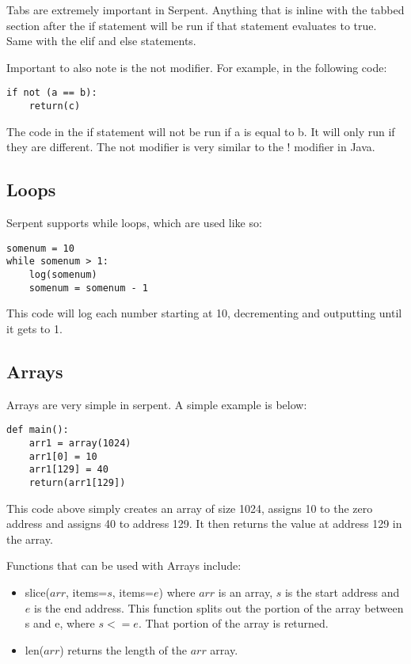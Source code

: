 \documentclass[12pt]{article}
\begin{document}
	Tabs are extremely important in Serpent. Anything that is inline with the tabbed section after the if statement will be run if that statement evaluates to true. Same with the elif and else statements. \cite{Serpent}
	
	Important to also note is the not modifier. For example, in the following code:
	
\begin{lstlisting}
if not (a == b):
	return(c)
\end{lstlisting}

The code in the if statement will not be run if a is equal to b. It will only run if they are different. The not modifier is very similar to the ! modifier in Java. \cite{Serpent}
	
\subsection{Loops}
Serpent supports while loops, which are used like so:
\begin{lstlisting}
somenum = 10
while somenum > 1:
	log(somenum)
	somenum = somenum - 1
\end{lstlisting}

This code will log each number starting at 10, decrementing and outputting until it gets to 1. \cite{Serpent 1.0 (old)}

\subsection{Arrays}
Arrays are very simple in serpent. A simple example is below:
\begin{lstlisting}
def main():
	arr1 = array(1024)
	arr1[0] = 10
	arr1[129] = 40
	return(arr1[129])
\end{lstlisting}

This code above simply creates an array of size 1024, assigns 10 to the zero address and assigns 40 to address 129. It then returns the value at address 129 in the array. \cite{Serpent,Serpent 1.0 (old)}

Functions that can be used with Arrays include:
\begin{itemize}
	\item slice($arr$, items=$s$, items=$e$) where $arr$ is an array, $s$ is the start address and $e$ is the end address. This function splits out the portion of the array between s and e, where $s <= e$. That portion of the array is returned.
	\item len($arr$) returns the length of the $arr$ array.
\end{itemize}
\end{document}
